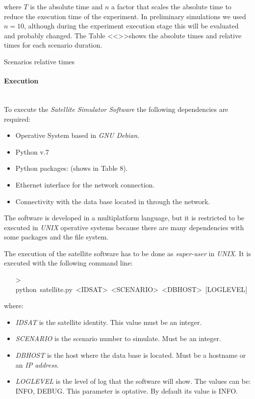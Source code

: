 where $T$ is the absolute time and $n$ a factor that scales the absolute time to reduce the execution time of the experiment. In preliminary simulations we used $n=10$, although during the experiment execution stage this will be evaluated and probably changed. The Table <<>>shows the absolute times and relative times for each scenario duration.


\begin{table}[hp]
  \centering
  {\small
  
  }
  \caption{Scenarios relative times}
  \label{table:sss-scenario-relative-time}
\end{table}


\paragraph{Execution}
\label{par:sat-simulator-execution}~\\

To execute the \emph{Satellite Simulator Software} the following dependencies are
required:
\begin{itemize}
\item Operative System based in \emph{GNU Debian}.
\item Python v.7
\item Python packages: (shows in Table 8).
\item Ethernet interface for the network connection.
\item Connectivity with the data base located in \bonfire through the network.
\end{itemize}
The \satss software is developed in a multiplatform language, but it is restricted to be executed in \emph{UNIX} operative systems because there are many dependencies with some packages and the file system.

The execution of the satellite software has to be done as \emph{super-user} in
\emph{UNIX}. It is executed with the following command line:
\begin{itemize}
\item[>] python~satellite.py~<IDSAT>~<SCENARIO>~<DBHOST>~[LOGLEVEL]
\end{itemize}

where:
\begin{itemize}
\item \emph{IDSAT} is the satellite identity. This value must be an integer.
\item \emph{SCENARIO} is the scenario number to simulate. Must be an integer.
\item \emph{DBHOST} is the host where the data base is located. Must be a hostname or an \emph{IP address}.
\item \emph{LOGLEVEL} is the level of log that the software will show. The values can be: INFO, DEBUG. This parameter is optative. By default its value is INFO.
\end{itemize}

